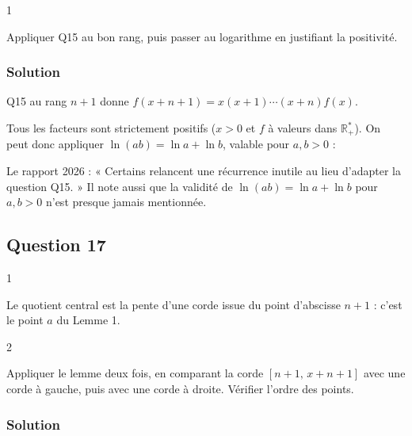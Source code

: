 \documentclass[11pt,a4paper]{article}
\newcommand{\equationajustee}[1]{%
  \sbox{\boiteequation}{$\displaystyle #1$}%
  \ifdim\wd\boiteequation>\linewidth
    \[\resizebox{\linewidth}{!}{\usebox{\boiteequation}}\]%
  \else
    \[#1\]%
  \fi}
\begin{document}
\begin{indication}{1}

Appliquer Q15 au bon rang, puis passer au logarithme en justifiant la positivité.

\end{indication}

\hypertarget{solution-15}{%
\subsubsection{Solution}\label{solution-15}}

Q15 au rang \(n+1\) donne \(f(x+n+1)=x(x+1)\cdots(x+n)f(x)\).

Tous les facteurs sont strictement positifs (\(x>0\) et \(f\) à valeurs dans \(\mathbb R_+^*\)). On peut donc appliquer \(\ln(ab)=\ln a+\ln b\), valable pour \(a,b>0\) :

\equationajustee{\boxed{g(x+n+1)=g(x)+\ln\big(x(x+1)\cdots(x+n)\big).}}

\begin{jury}

Le rapport 2026 : « Certains relancent une récurrence inutile au lieu d'adapter la question Q15. » Il note aussi que la validité de \(\ln(ab)=\ln a+\ln b\) pour \(a,b>0\) n'est presque jamais mentionnée.

\end{jury}

\hypertarget{question-17}{%
\subsection{Question 17}\label{question-17}}

\begin{indication}{1}

Le quotient central est la pente d'une corde issue du point d'abscisse \(n+1\) : c'est le point \(a\) du Lemme 1.

\end{indication}

\begin{indication}{2}

Appliquer le lemme deux fois, en comparant la corde \([n+1,\,x+n+1]\) avec une corde à gauche, puis avec une corde à droite. Vérifier l'ordre des points.

\end{indication}

\hypertarget{solution-16}{%
\subsubsection{Solution}\label{solution-16}}
\end{document}
